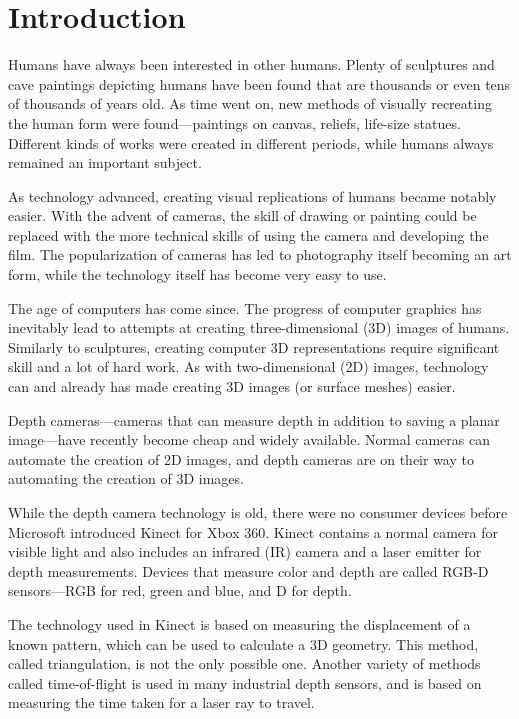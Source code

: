 \chapter{Introduction}

Humans have always been interested in other humans. Plenty of sculptures and cave paintings depicting humans have been found that are thousands or even tens of thousands of years old. As time went on, new methods of visually recreating the human form were found---paintings on canvas, reliefs, life-size statues. Different kinds of works were created in different periods, while humans always remained an important subject.

As technology advanced, creating visual replications of humans became notably easier. With the advent of cameras, the skill of drawing or painting could be replaced with the more technical skills of using the camera and developing the film. The popularization of cameras has led to photography itself becoming an art form, while the technology itself has become very easy to use.

The age of computers has come since. The progress of computer graphics has inevitably lead to attempts at creating three-dimensional (3D) images of humans. Similarly to sculptures, creating computer 3D representations require significant skill and a lot of hard work. As with two-dimensional (2D) images, technology can and already has made creating 3D images (or surface meshes) easier.

Depth cameras---cameras that can measure depth in addition to saving a planar image---have recently become cheap and widely available. Normal cameras can automate the creation of 2D images, and depth cameras are on their way to automating the creation of 3D images.

While the depth camera technology is old, there were no consumer devices before Microsoft introduced Kinect for Xbox 360. Kinect contains a normal camera for visible light and also includes an infrared (IR) camera and a laser emitter for depth measurements. Devices that measure color and depth are called RGB-D sensors---RGB for red, green and blue, and D for depth.

The technology used in Kinect is based on measuring the displacement of a known pattern, which can be used to calculate a 3D geometry. This method, called triangulation, is not the only possible one. Another variety of methods called time-of-flight is used in many industrial depth sensors, and is based on measuring the time taken for a laser ray to travel.

